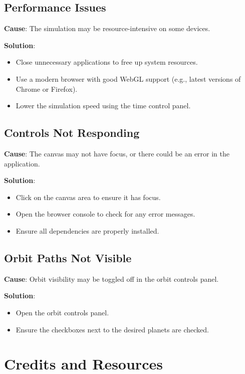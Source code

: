 \documentclass[12pt, a4paper]{article}
\begin{document}
\subsection{Performance Issues}

\textbf{Cause}: The simulation may be resource-intensive on some devices.

\textbf{Solution}:

\begin{itemize}
    \item Close unnecessary applications to free up system resources.
    \item Use a modern browser with good WebGL support (e.g., latest versions of Chrome
          or Firefox).
    \item Lower the simulation speed using the time control panel.
\end{itemize}

\subsection{Controls Not Responding}

\textbf{Cause}: The canvas may not have focus, or there could be an error in the application.

\textbf{Solution}:

\begin{itemize}
    \item Click on the canvas area to ensure it has focus.
    \item Open the browser console to check for any error messages.
    \item Ensure all dependencies are properly installed.
\end{itemize}

\subsection{Orbit Paths Not Visible}

\textbf{Cause}: Orbit visibility may be toggled off in the orbit controls panel.

\textbf{Solution}:

\begin{itemize}
    \item Open the orbit controls panel.
    \item Ensure the checkboxes next to the desired planets are checked.
\end{itemize}

\section{Credits and Resources}
\end{document}
